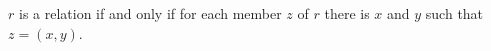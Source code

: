 $r$ is a relation if and only if for each member $z$ of $r$ there is $x$ and $y$ such that $z = (x, y)$.
